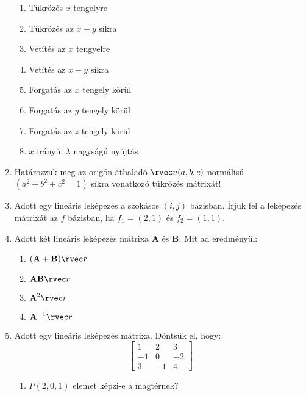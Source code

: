 \documentclass[a4paper, 12pt]{scrartcl}
\begin{document}
\begin{enumerate}
\begin{multicols}{2}
          \begin{enumerate}
            \item Tükrözés $x$ tengelyre
            \item Tükrözés az $x-y$ síkra
            \item Vetítés az $x$ tengyelre
            \item Vetítés az $x-y$ síkra
            \item Forgatás az $x$ tengely körül
            \item Forgatás az $y$ tengely körül
            \item Forgatás az $z$ tengely körül
            \item $x$ irányú, $\lambda$ nagyságú nyújtás
          \end{enumerate}
        \end{multicols}
  \item Határozzuk meg az origón áthaladó $\rvec u (a,b,c)$ normálisú $(a^2+b^2+c^2 = 1)$ síkra vonatkozó tükrözés mátrixát!
  \item Adott egy lineáris leképezés a szokásos $(i, j)$ bázisban. Írjuk fel a leképezés mátrixát az $f$ bázisban, ha $f_1 = (2,1)$ és $f_2 = (1,1)$.
  \item Adott két lineáris leképezés mátrixa $\textbf{A}$ és $\textbf{B}$. Mit ad eredményül:
        \begin{multicols}{2}
          \begin{enumerate}
            \item $(\textbf{A}+\textbf{B})\rvec r$
            \item $\textbf{A}\textbf{B}\rvec r$
            \item $\textbf{A}^2 \rvec r$
            \item $\textbf{A}^{-1}\rvec r$
          \end{enumerate}
        \end{multicols}
        \clearpage
  \item Adott egy lineáris leképezés mátrixa. Döntsük el, hogy:
        $$\begin{bmatrix}
            1  & 2  & 3  \\
            -1 & 0  & -2 \\
            3  & -1 & 4
          \end{bmatrix}
        $$
        \begin{multicols}{2}
          \begin{enumerate}
            \item $P(2,0,1)$ elemet képzi-e a magtérnek?

\end{enumerate}
\end{multicols}
\end{enumerate}
\end{document}
